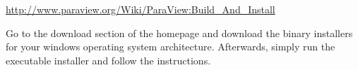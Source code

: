 \href{http://www.paraview.org/Wiki/ParaView:Build\_And\_Install}{http://www.paraview.org/Wiki/ParaView:Build\_And\_Install}


Go to the download section of the \marktool[\paraviewaddress]{\paraviewname} homepage and download the binary installers for your windows operating system architecture. Afterwards, simply run the executable installer and follow the instructions.